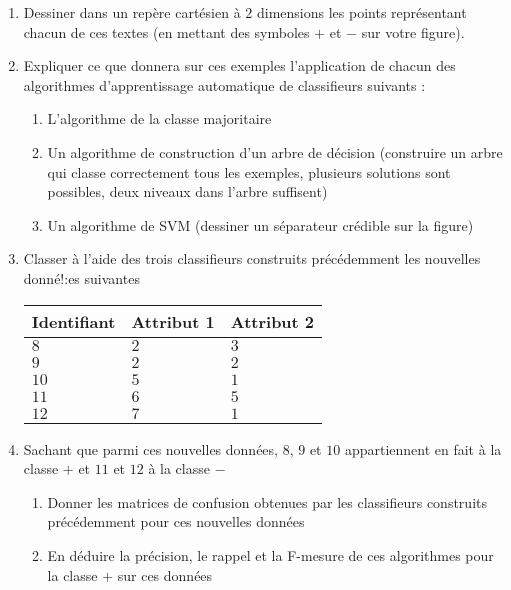 \documentclass[a4paper, 11pt]{article}
\begin{document}
\begin{enumerate}
    \item Dessiner dans un repère cartésien à $2$ dimensions les points représentant chacun de ces textes (en mettant des symboles $+$ et $-$ sur votre figure).
    \item Expliquer ce que donnera sur ces exemples l'application de chacun des algorithmes d'apprentissage automatique de classifieurs suivants :
        \begin{enumerate}
            \item L'algorithme de la classe majoritaire
            \item Un algorithme de construction d'un arbre de décision
                (construire un arbre qui classe correctement tous les exemples, plusieurs solutions sont possibles, deux niveaux dans l'arbre suffisent)
            \item Un algorithme de SVM (dessiner un séparateur crédible sur la figure)
        \end{enumerate}
    \item Classer à l'aide des trois classifieurs construits précédemment les nouvelles donné!:es suivantes
        \begin{center}
        \begin{tabu} to 0.5
            \toprule
            \textbf{Identifiant} & \textbf{Attribut 1} & \textbf{Attribut 2}\\
            \midrule
            $8$ & $2$ & $3$\\
            $9$ & $2$ & $2$\\
            $10$ & $5$ & $1$\\
            $11$ & $6$ & $5$\\
            $12$ & $7$ & $1$\\
            \bottomrule
        \end{tabu}
        \end{center}

    \item Sachant que parmi ces nouvelles données, $8$, $9$ et $10$ appartiennent en fait à la classe $+$ et $11$ et $12$ à la classe $-$
        \begin{enumerate}
            \item Donner les matrices de confusion obtenues par les classifieurs construits précédemment pour ces nouvelles données
            \item En déduire la précision, le rappel et la F-mesure de ces algorithmes pour la classe $+$ sur ces données
        \end{enumerate}
\end{enumerate}
\end{document}
